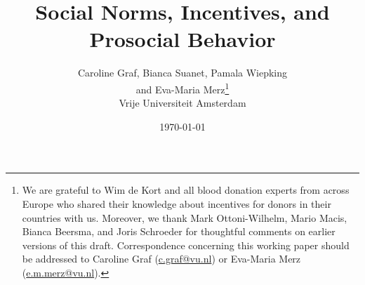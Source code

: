 \documentclass[AER]{AEA}
\begin{document}
\title{Social Norms, Incentives, and Prosocial Behavior}
\author{Caroline Graf, Bianca Suanet, Pamala Wiepking\\ and Eva-Maria Merz\thanks{We are grateful to Wim de Kort and all blood donation experts from across Europe who shared their knowledge about incentives for donors in their countries with us. Moreover, we thank Mark Ottoni-Wilhelm, Mario Macis, Bianca Beersma, and Joris Schroeder for thoughtful comments on earlier versions of this draft. Correspondence concerning this working paper should be addressed to Caroline Graf (\href{mailto:c.graf@vu.nl}{c.graf@vu.nl}) or Eva-Maria Merz (\href{mailto:e.m.merz@vu.nl}{e.m.merz@vu.nl}).} \\ \vspace{0.3cm} \small Vrije Universiteit Amsterdam}
\date{\today}
\pubVolume{}
\pubIssue{}
\JEL{}
\end{document}
